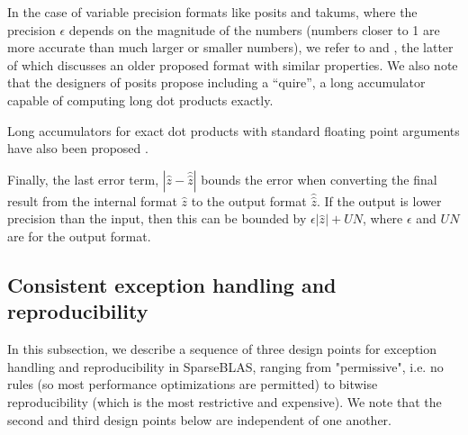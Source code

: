 \documentclass[manuscript,review]{acmart}
\begin{document}
In the case of variable precision formats like posits and takums, where the precision $\epsilon$
depends on the magnitude
of the numbers (numbers closer to 1 are more accurate than much
larger or smaller numbers), we refer to \cite{GoodBadUgly} and \cite{Demmel87}, the latter of which discusses an older proposed
format with similar properties.
We also note that the designers of posits propose including a
``quire'', a long accumulator capable of computing long dot products exactly. 

Long accumulators for
exact dot products with standard floating point
arguments have also been proposed
\cite{ExactDotProduct,KulischMiranker1981}.

Finally, the last error term, $|\hat{z} - \hat{\hat{z}}|$ bounds the
error when converting the final result from the internal format $\hat{z}$ to
the output format $\hat{\hat{z}}$. If the output is lower precision than the input,
then this can be bounded by $\epsilon |\hat{z}| + UN$, where 
$\epsilon$ and $UN$ are for the output format.


\iffalse
\subsection{Consistent exception handling and reproducibility}

In this subsection, we describe a sequence of three design points for exception handling and reproducibility in SparseBLAS, ranging from "permissive", i.e. no rules (so most performance optimizations are permitted) to bitwise reproducibility (which is the most restrictive and expensive). We note that the second and third design points
below are independent of one another.
\end{document}
